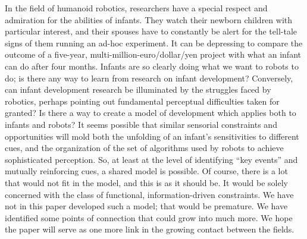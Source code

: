 


In the field of humanoid robotics, researchers have a special respect
and admiration for the abilities of infants.  They watch their newborn
children with particular interest, and their spouses have to
constantly be alert for the tell-tale signs of them running an ad-hoc
experiment.  It can be depressing to compare the outcome of a 
five-year, multi-million-euro/dollar/yen project with what an
infant can do after four months.  Infants are so clearly doing what
we want to robots to do; is there any way to learn from research
on infant development?
Conversely, can infant development research be illuminated by
the struggles faced by robotics, perhaps pointing out fundamental
perceptual difficulties taken for granted?
%
%
Is there a way to create a model of development which applies both to infants
and robots?
%
It seems possible that similar sensorial constraints and opportunities
will mold both the unfolding of an infant's sensitivities to
different cues, and the organization of the set of algorithms used by
robots to achieve sophisticated perception.
%
So, at least at the level of identifying ``key events'' and mutually
reinforcing cues, a shared model is possible.
%
%
%
%
%
Of course, there is a lot that would not fit in the model, and this is
as it should be.  It would be solely concerned with the class of 
functional, information-driven constraints.
%
We have not in this paper developed such a model; that would be
premature.  We have identified some points of connection that could
grow into much more.  We hope the paper will serve as one more link in
the growing contact between the fields.







